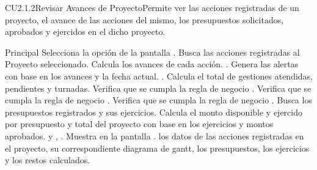 	\begin{UseCase}{CU2.1.2}{Revisar Avances de Proyecto}{Permite ver las acciones registradas de un proyecto, el avance de las acciones del mismo, los presupuestos solicitados, aprobados y ejercidos en el dicho proyecto.}
	\end{UseCase}
	
	
	\begin{UCtrayectoria}{Principal}
		\UCpaso[\UCactor] Selecciona la opción  de la pantalla .%
		\UCpaso Busca las acciones registradas al Proyecto seleccionado.
		\UCpaso Calcula los avances de cada acción. .
		\UCpaso Genera las alertas con base en los avances y la fecha actual. .
		\UCpaso Calcula el total de gestiones atendidas, pendientes y turnadas.
		\UCpaso Verifica que se cumpla la regla de negocio .
		\UCpaso Verifica que se cumpla la regla de negocio .
		\UCpaso Verifica que se cumpla la regla de negocio .
		\UCpaso Busca los presupuestos registrados y sus ejercicios.
		\UCpaso Calcula el monto disponible y ejercido por presupuesto y total del proyecto con base en los ejercicios y montos aprobados. y , .
		\UCpaso Muestra en la pantalla . los datos de las acciones registradas en el proyecto, su correspondiente diagrama de gantt, los presupuestos, los ejercicios y los restos calculados.
		   
		  		
	\end{UCtrayectoria}	

